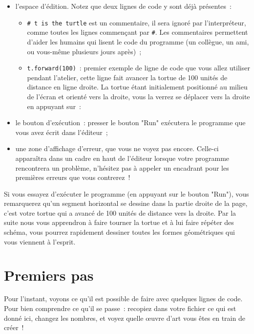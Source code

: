 \documentclass[11pt,a4paper]{article}
\begin{document}
\begin{itemize}
    \item l'espace d'édition. Notez que deux lignes de code y sont déjà
        présentes~:
        \begin{itemize}
            \item \lstinline{# t is the turtle} est un commentaire, il sera
                ignoré par l'interpréteur, comme toutes les lignes commençant
                par \lstinline{#}.  Les commentaires permettent d'aider les
                humains qui lisent le code du programme (un collègue, un ami, ou
                vous-même plusieurs jours après)~;
            \item \lstinline{t.forward(100)}~: premier exemple de ligne de code
                que vous allez utiliser pendant l'atelier, cette ligne fait
                avancer la tortue de 100 unités de distance en ligne droite. La
                tortue étant initialement positionné au milieu de l'écran et
                orienté vers la droite, vous la verrez se déplacer vers la
                droite en appuyant sur~:
        \end{itemize}
    \item le bouton d'exécution~: presser le bouton "Run" exécutera le programme
        que vous avez écrit dans l'éditeur~;
    \item une zone d'affichage d'erreur, que vous ne voyez pas encore. Celle-ci
        apparaîtra dans un cadre en haut de l'éditeur lorsque votre programme
        rencontrera un problème, n'hésitez pas à appeler un encadrant pour les
        premières erreurs que vous contrerez~!
\end{itemize}

Si vous essayez d'exécuter le programme (en appuyant sur le bouton "Run"),
vous remarquerez qu'un segment horizontal se dessine dans la partie droite de la
page, c'est votre tortue qui a avancé de 100 unités de distance vers la droite.
Par la suite nous vous apprendron à faire tourner la tortue et à lui faire
répéter des schéma, vous pourrez rapidement dessiner toutes les formes
géométriques qui vous viennent à l'esprit.

\section{Premiers pas}

Pour l'instant, voyons ce qu'il est possible de faire avec quelques lignes de
code. Pour bien comprendre ce qu'il se passe~: recopiez dans votre fichier ce
qui est donné ici, changez les nombres, et voyez quelle œuvre d'art vous êtes en
train de créer~!
\end{document}
